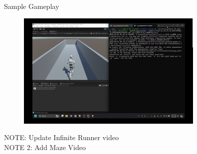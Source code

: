 \begin{frame}{Sample Gameplay}
    \begin{figure}[htpb!]
        \centering
        \href{https://youtu.be/3T2kwwnvs3c}{%
        \includegraphics[width=0.8\textwidth]{figures/gameplay/thesisGameplayThumbnail}%
        }
    \end{figure}
    NOTE: Update Infinite Runner video\\
    NOTE 2: Add Maze Video
\end{frame}